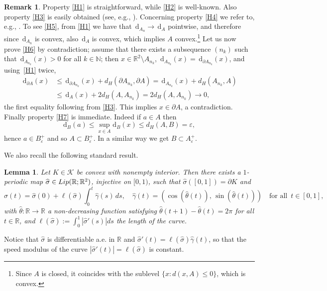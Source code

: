 \documentclass[11pt]{article}
\numberwithin{equation}{section}
\newcommand{\R}{\mathbb{R}}
\let\eps\varepsilon
\let\len\ell
\newcommand{\di}{\,\mathrm{d}}
\newtheorem{lemma}[theorem]{Lemma}
\theoremstyle{definition}
\newtheorem{remark}[theorem]{Remark}
\begin{document}
\begin{remark}
Property \ref{H1} is straightforward, while \ref{H2} is well-known. Also property \ref{H3} is easily obtained (see, e.g., \cite{W}).
Concerning property \ref{H4} we refer to, e.g., \cite[Cor.\,2]{AF}.
To see \ref{H5}, from \ref{H1} we have that $\di_{A_n} \to \di_A$ pointwise,
and therefore since $\di_{A_n}$ is convex, also $\di_A$ is convex, which implies $A$ convex.\footnote{Since $A$ is closed, it
coincides with the sublevel $\{x:d(x,A)\leq 0\}$, which is convex.}
Let us now prove \ref{H6} by contradiction;
assume that there exists a subsequence $(n_k)$ such that $\di_{A_{n_k}}(x)>0$
for all $k\in \mathbb N$; then $x\in \R^2\setminus A_{n_k}$,
$\di_{A_{n_k}}(x)=\di_{\partial A_{n_k}}(x) $, and using~\ref{H1} twice,
\begin{align*}
\di_{\partial A}(x)&\leq \di_{\partial A_{n_k}}(x)+
d_H(\partial A_{n_k},\partial A)=\di_{A_{n_k}}(x)+d_H( A_{n_k},A)\\
&\leq \di_A(x)+ 2d_H(A, A_{n_k})=2d_H(A, A_{n_k})\to0,
\end{align*}
the first equality following from \ref{H3}.
This implies $x\in \partial A$, a contradiction. Finally property \ref{H7} is immediate. Indeed if $a\in A$ then
\begin{equation*}
\mathrm{d}_B(a)\le \sup_{x\in A} \mathrm{d}_B(x)\le d_H(A,B)=\eps,
\end{equation*}
hence $a\in B_\eps^+$ and so $A\subset B_\eps^+$. In a similar way we get $B\subset A_\eps^+$.
\end{remark}

We also recall the following standard result.

\begin{lemma}\label{lm:charact_convex_sets}
Let $K\in\mathcal K$ be convex with nonempty interior.
Then there exists a $1$-periodic map $\widehat \sigma\in {\rm{Lip}}(\mathbb R;\R^2)$, injective on $[0,1)$, such that $\widehat \sigma([0,1])=\partial K$ and
\begin{equation*}
\widehat\sigma(t)=\widehat \sigma(0)+\len(\widehat\sigma)\int_0^t\widehat \gamma(s)\,ds,\quad \widehat\gamma(t)=(\cos(\widehat\theta(t)),\,\sin(\widehat\theta(t)))\quad \text{for all }\, t\in[0,1],
\end{equation*}
with $\widehat \theta\colon\R\to\R$ a non-decreasing function satisfying $\widehat \theta(t+1)-\widehat \theta(t)=2\pi$ for all $t\in\R$, and
$\len(\widehat\sigma):=\int_0^1|\widehat \sigma'(s)|ds$ the length of the curve.
\end{lemma}
Notice that $\widehat \sigma$ is differentiable a.e. in $\mathbb R$ and $\widehat \sigma'(t)=\len(\widehat\sigma)\widehat \gamma(t)$, so that the speed modulus of the curve
$|\hat\sigma'(t)|=\len(\widehat\sigma)$ is constant.
\end{document}
